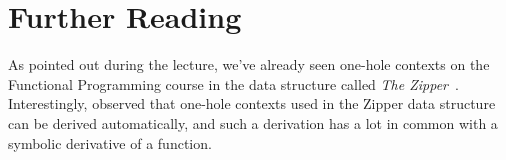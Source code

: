 \section{Further Reading}

As pointed out during the lecture, we've already seen one-hole contexts
on the Functional Programming course
in the data structure called \emph{The Zipper}~\citep{Huet97}.
Interestingly, \citet{McBride} observed that one-hole contexts used
in the Zipper data structure can be derived automatically,
and such a derivation has a lot in common with
a symbolic derivative of a function.

